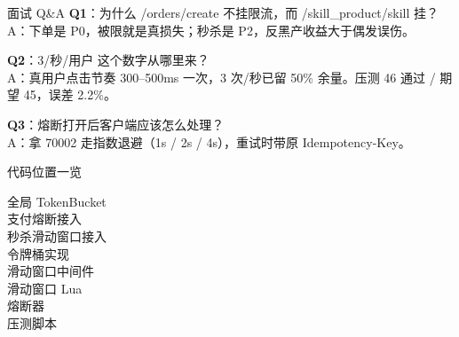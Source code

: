 \appendix

\begin{frame}{面试 Q\&A}
\textbf{Q1}：为什么 /orders/create 不挂限流，而 /skill\_product/skill 挂？\\
\hspace{4mm}\small A：下单是 P0，被限就是真损失；秒杀是 P2，反黑产收益大于偶发误伤。

\vspace{2mm}
\textbf{Q2}：3/秒/用户 这个数字从哪里来？\\
\hspace{4mm}\small A：真用户点击节奏 300--500ms 一次，3 次/秒已留 50\% 余量。压测 46 通过 / 期望 45，误差 2.2\%。

\vspace{2mm}
\textbf{Q3}：熔断打开后客户端应该怎么处理？\\
\hspace{4mm}\small A：拿 70002 走指数退避（1s / 2s / 4s），重试时带原 Idempotency-Key。
\end{frame}

\begin{frame}{代码位置一览}
\begin{description}
  \item[全局 TokenBucket]
  \item[支付熔断接入]
  \item[秒杀滑动窗口接入]
  \item[令牌桶实现]
  \item[滑动窗口中间件]
  \item[滑动窗口 Lua]
  \item[熔断器]
  \item[压测脚本]
\end{description}
\vspace{2mm}
\end{frame}


